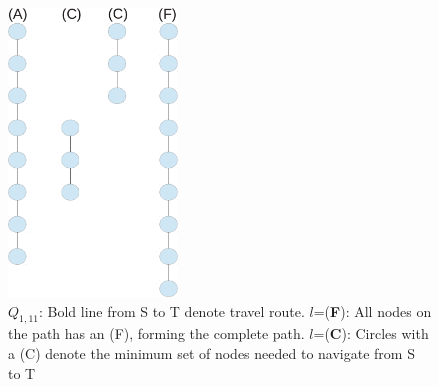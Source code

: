 \begin{figure}[hbt]
  \center
        \includegraphics[width=0.4\textwidth]{figures/altmap}
        \caption{$Q_{1,11}$: Bold line from S to T denote travel route. $l$=(\textbf{F}): All nodes on the path has an (F), forming the complete path. 
        $l$=(\textbf{C}): Circles with a (C) denote the minimum set of nodes needed to navigate from S to T}
  \label{fig:minroute}
\end{figure}


% 
% 
% 
% 
% 
% 
